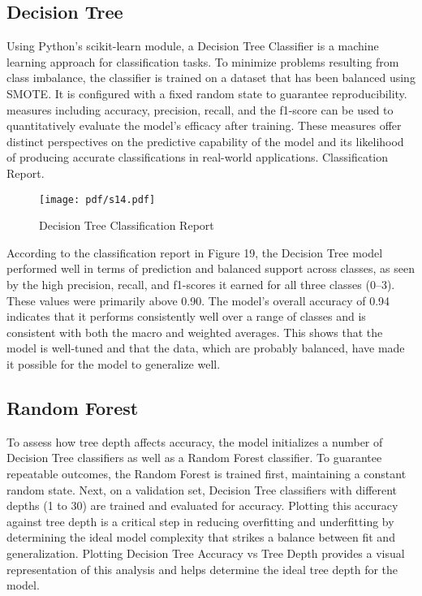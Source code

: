 \subsection {Decision Tree}
Using Python's scikit-learn module, a Decision Tree Classifier is a machine learning approach for classification tasks. To minimize problems resulting from class imbalance, the classifier is trained on a dataset that has been balanced using SMOTE. It is configured with a fixed random state to guarantee reproducibility.  measures including accuracy, precision, recall, and the f1-score can be used to quantitatively evaluate the model's efficacy after training. These measures offer distinct perspectives on the predictive capability of the model and its likelihood of producing accurate classifications in real-world applications.
Classification Report.

\begin{figure}[ht!]
  \raggedright
  \texttt{[image: pdf/s14.pdf]}
  \vspace{0pt}
  \caption{\textbf{ }Decision Tree Classification Report}
\end{figure}

According to the classification report in Figure 19, the Decision Tree model performed well in terms of prediction and balanced support across classes, as seen by the high precision, recall, and f1-scores it earned for all three classes (0–3). These values were primarily above 0.90. The model's overall accuracy of 0.94 indicates that it performs consistently well over a range of classes and is consistent with both the macro and weighted averages. This shows that the model is well-tuned and that the data, which are probably balanced, have made it possible for the model to generalize well.

\subsection {Random Forest}
To assess how tree depth affects accuracy, the model initializes a number of Decision Tree classifiers as well as a Random Forest classifier. To guarantee repeatable outcomes, the Random Forest is trained first, maintaining a constant random state. Next, on a validation set, Decision Tree classifiers with different depths (1 to 30) are trained and evaluated for accuracy. Plotting this accuracy against tree depth is a critical step in reducing overfitting and underfitting by determining the ideal model complexity that strikes a balance between fit and generalization. Plotting Decision Tree Accuracy vs Tree Depth provides a visual representation of this analysis and helps determine the ideal tree depth for the model.

